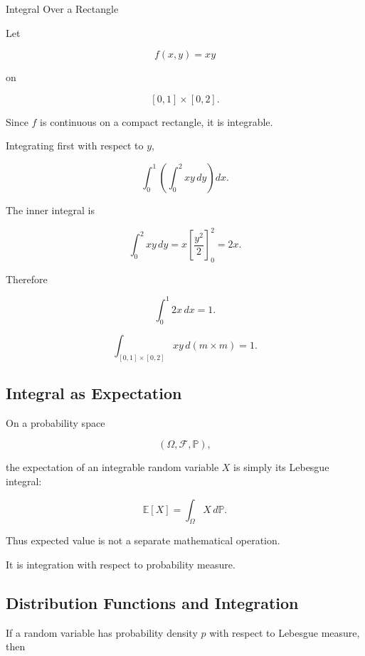 \begin{workedexamplebox}{Integral Over a Rectangle}

Let

\[
f(x,y)=xy
\]

on

\[
[0,1]\times[0,2].
\]

Since \(f\) is continuous on a compact rectangle, it is integrable.

Integrating first with respect to \(y\),

\[
\int_0^1
\left(
\int_0^2xy\,dy
\right)
dx.
\]

The inner integral is

\[
\int_0^2xy\,dy
=
x\left[\frac{y^2}{2}\right]_0^2
=
2x.
\]

Therefore

\[
\int_0^1 2x\,dx
=
1.
\]

\begin{answerbox}
\[
\boxed{
\int_{[0,1]\times[0,2]}
xy\,d(m\times m)
=
1.
}
\]
\end{answerbox}
\end{workedexamplebox}

\subsection{Integral as Expectation}
\label{subsec:integral-as-expectation}

On a probability space

\[
(\Omega,\mathcal{F},\mathbb{P}),
\]

the expectation of an integrable random variable \(X\) is simply its
Lebesgue integral:

\[
\boxed{
\mathbb{E}[X]
=
\int_\Omega X\,d\mathbb{P}.
}
\]

Thus expected value is not a separate mathematical operation.

It is integration with respect to probability measure.

\subsection{Distribution Functions and Integration}
\label{subsec:distribution-integration}

If a random variable has probability density \(p\) with respect to
Lebesgue measure, then

